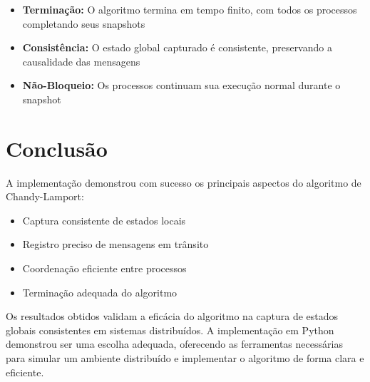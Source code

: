\documentclass[12pt]{article}
\begin{document}
\begin{itemize}
    \item \textbf{Terminação:} O algoritmo termina em tempo finito, com todos os processos completando seus snapshots
    \item \textbf{Consistência:} O estado global capturado é consistente, preservando a causalidade das mensagens
    \item \textbf{Não-Bloqueio:} Os processos continuam sua execução normal durante o snapshot
\end{itemize}

\section{Conclusão}

A implementação demonstrou com sucesso os principais aspectos do algoritmo de Chandy-Lamport:
\begin{itemize}
    \item Captura consistente de estados locais
    \item Registro preciso de mensagens em trânsito
    \item Coordenação eficiente entre processos
    \item Terminação adequada do algoritmo
\end{itemize}

Os resultados obtidos validam a eficácia do algoritmo na captura de estados globais consistentes em sistemas distribuídos. A implementação em Python demonstrou ser uma escolha adequada, oferecendo as ferramentas necessárias para simular um ambiente distribuído e implementar o algoritmo de forma clara e eficiente.

\renewcommand{\refname}{Referências}


\end{document}
